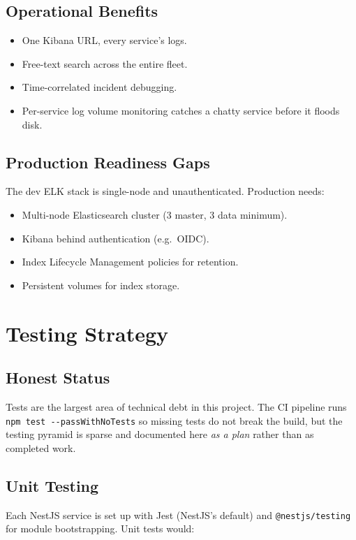 \documentclass[11pt,a4paper]{article}
\begin{document}
\subsection{Operational Benefits}
\begin{itemize}[leftmargin=*]
  \item One Kibana URL, every service's logs.
  \item Free-text search across the entire fleet.
  \item Time-correlated incident debugging.
  \item Per-service log volume monitoring catches a chatty service
        before it floods disk.
\end{itemize}

\subsection{Production Readiness Gaps}
The dev ELK stack is single-node and unauthenticated.  Production
needs:

\begin{itemize}[leftmargin=*]
  \item Multi-node Elasticsearch cluster (3 master, 3 data minimum).
  \item Kibana behind authentication (e.g.\ OIDC).
  \item Index Lifecycle Management policies for retention.
  \item Persistent volumes for index storage.
\end{itemize}

\section{Testing Strategy}

\subsection{Honest Status}
Tests are the largest area of technical debt in this project.  The
CI pipeline runs \texttt{npm test -{}-passWithNoTests} so missing
tests do not break the build, but the testing pyramid is sparse and
documented here \emph{as a plan} rather than as completed work.

\subsection{Unit Testing}
Each NestJS service is set up with Jest (NestJS's default) and
\texttt{@nestjs/testing} for module bootstrapping.  Unit tests would:
\end{document}
